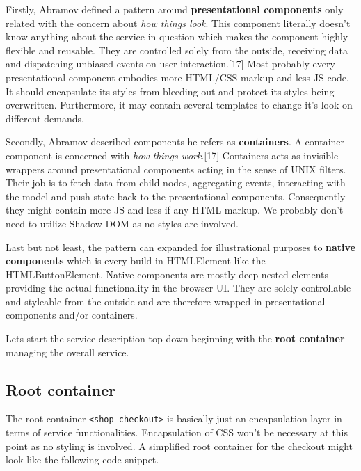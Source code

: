 \documentclass[]{article}
\begin{document}
Firstly, Abramov defined a pattern around \textbf{presentational
components} only related with the concern about \emph{how things look}.
This component literally doesn't know anything about the service in
question which makes the component highly flexible and reusable. They
are controlled solely from the outside, receiving data and dispatching
unbiased events on user interaction.{[}17{]} Most probably every
presentational component embodies more HTML/CSS markup and less JS code.
It should encapsulate its styles from bleeding out and protect its
styles being overwritten. Furthermore, it may contain several templates
to change it's look on different demands.

Secondly, Abramov described components he refers as \textbf{containers}.
A container component is concerned with \emph{how things work}.{[}17{]}
Containers acts as invisible wrappers around presentational components
acting in the sense of UNIX filters. Their job is to fetch data from
child nodes, aggregating events, interacting with the model and push
state back to the presentational components. Consequently they might
contain more JS and less if any HTML markup. We probably don't need to
utilize Shadow DOM as no styles are involved.

Last but not least, the pattern can expanded for illustrational purposes
to \textbf{native components} which is every build-in HTMLElement like
the HTMLButtonElement. Native components are mostly deep nested elements
providing the actual functionality in the browser UI. They are solely
controllable and styleable from the outside and are therefore wrapped in
presentational components and/or containers.

Lets start the service description top-down beginning with the
\textbf{root container} managing the overall service.

\subsection{Root container}\label{root-container}

The root container \texttt{\textless{}shop-checkout\textgreater{}} is
basically just an encapsulation layer in terms of service
functionalities. Encapsulation of CSS won't be necessary at this point
as no styling is involved. A simplified root container for the checkout
might look like the following code snippet.
\end{document}
